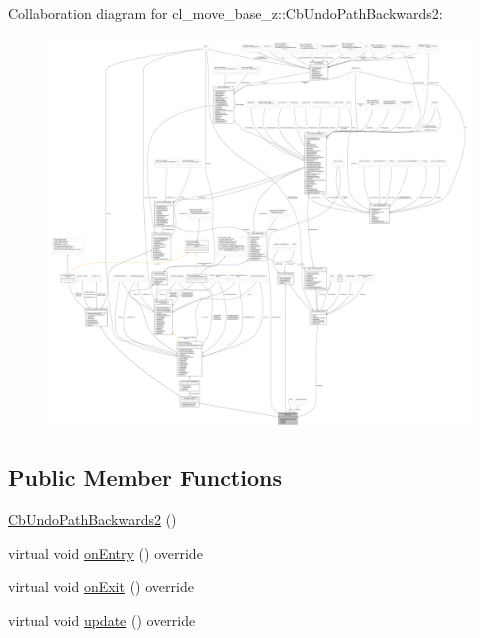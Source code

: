 Collaboration diagram for cl\+\_\+move\+\_\+base\+\_\+z\+:\+:Cb\+Undo\+Path\+Backwards2\+:
\nopagebreak
\begin{figure}[H]
\begin{center}
\leavevmode
\includegraphics[width=350pt]{classcl__move__base__z_1_1CbUndoPathBackwards2__coll__graph}
\end{center}
\end{figure}
\subsection*{Public Member Functions}
\begin{DoxyCompactItemize}
\item 
\hyperlink{classcl__move__base__z_1_1CbUndoPathBackwards2_a0f202bf7a4b1cc1db426a0c2ad1434f6}{Cb\+Undo\+Path\+Backwards2} ()
\item 
virtual void \hyperlink{classcl__move__base__z_1_1CbUndoPathBackwards2_a1b96187df9be6ce0fbdb5511147685d3}{on\+Entry} () override
\item 
virtual void \hyperlink{classcl__move__base__z_1_1CbUndoPathBackwards2_ae493fcd813176d8473ff08680beb7afe}{on\+Exit} () override
\item 
virtual void \hyperlink{classcl__move__base__z_1_1CbUndoPathBackwards2_a62f0d53fc341ca6d241637cc0e4b2e30}{update} () override
\end{DoxyCompactItemize}

